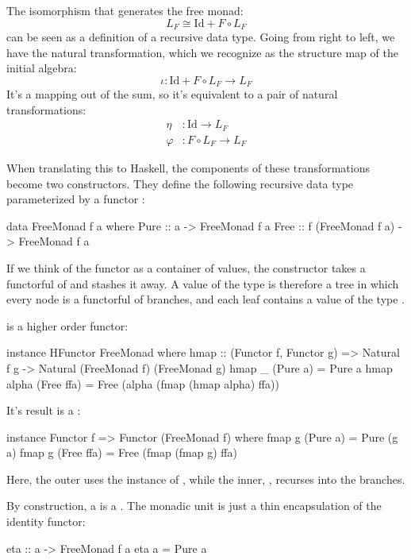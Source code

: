\documentclass[DaoFP]{subfiles}
\begin{document}
The isomorphism that generates the free monad:
\[ L_F \cong \text{Id} + F \circ L_F \]
can be seen as a definition of a recursive data type. Going from right to left, we have the natural transformation, which we recognize as the structure map of the initial algebra:
\[\iota \colon \text{Id} + F \circ L_F \to L_F\]
It's a mapping out of the sum, so it's equivalent to a pair of natural transformations:
\begin{align*}
\eta &\colon \text{Id} \to L_F
\\
\varphi &\colon F \circ L_F \to L_F
\end{align*}

When translating this to Haskell, the components of these transformations become two constructors. They define the following recursive data type parameterized by a functor :
\begin{haskell}
data FreeMonad f a where
   Pure :: a -> FreeMonad f a
   Free :: f (FreeMonad f a) -> FreeMonad f a
\end{haskell}

If we think of the functor  as a container of values, the constructor  takes a functorful of  and stashes it away. A value of the type  is therefore a tree in which every node is a functorful of branches, and each leaf contains a value of the type .

 is a higher order functor:
\begin{haskell}
instance HFunctor FreeMonad where
   hmap :: (Functor f, Functor g) =>
      Natural f g -> Natural (FreeMonad f) (FreeMonad g)
   hmap _ (Pure a) = Pure a
   hmap alpha (Free ffa) = Free (alpha (fmap (hmap alpha) ffa))
\end{haskell}

It's result is a :
\begin{haskell}
instance Functor f => Functor (FreeMonad f) where
  fmap g (Pure a) = Pure (g a)
  fmap g (Free ffa) = Free (fmap (fmap g) ffa)
\end{haskell}
Here, the outer  uses the  instance of , while the inner, , recurses into the branches.

By construction, a  is a . The monadic unit  is just a thin encapsulation of the identity functor:
\begin{haskell}
eta :: a -> FreeMonad f a
eta a = Pure a
\end{haskell}
\end{document}
